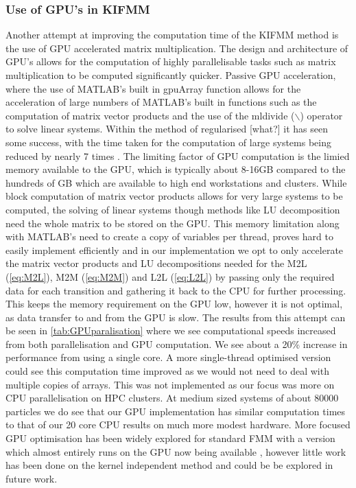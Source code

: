 \subsubsection{Use of GPU's in KIFMM}
Another attempt at improving the computation time of the KIFMM method is the use of GPU accelerated matrix multiplication. The design and architecture of GPU's allows for the computation of highly parallelisable tasks such as matrix multiplication to be computed significantly quicker. Passive GPU acceleration, where the use of MATLAB's built in gpuArray function allows for the acceleration of large numbers of MATLAB's built in functions such as the computation of matrix vector products and the use of the mldivide ($\backslash$) operator to solve linear systems. Within the method of regularised [what?] it has seen some success, with the time taken for the computation of large systems being reduced by nearly 7 times \cite{Gallagher2020}. The limiting factor of GPU computation is the limied memory available to the GPU, which is typically about 8-16GB compared to the hundreds of GB which are available to high end workstations and clusters. While block computation of matrix vector products allows for very large systems to be computed, the solving of linear systems though methods like LU decomposition need the whole matrix to be stored on the GPU. This memory limitation along with MATLAB's need to create a copy of variables per thread, proves hard to easily implement efficiently and in our implementation we opt to only accelerate the matrix vector products and LU decompositions needed for the M2L (\cref{eq:M2L}), M2M (\cref{eq:M2M}) and L2L (\cref{eq:L2L}) by passing only the required data for each transition and gathering it back to the CPU for further processing. This keeps the memory requirement on the GPU low, however it is not optimal, as data transfer to and from the GPU is slow. The results from this attempt can be seen in \cref{tab:GPUparalisation} where we see computational speeds increased from both parallelisation and GPU computation. We see about a 20\% increase in performance from using a single core. A more single-thread optimised version could see this computation time improved as we would not need to deal with multiple copies of arrays. This was not implemented as our focus was more on CPU parallelisation on HPC clusters. At medium sized systems of about 80000 particles we do see that our GPU implementation has similar computation times to that of our 20 core CPU results on much more modest hardware. More focused GPU optimisation has been widely explored for standard FMM with a version which almost entirely runs on the GPU now being available \cite{Yokota,Hamada200942Turbulence,Wilson2021ATraversal,Kohnke2020AAccuracy}, however little work has been done on the kernel independent method and could be be explored in future work.

